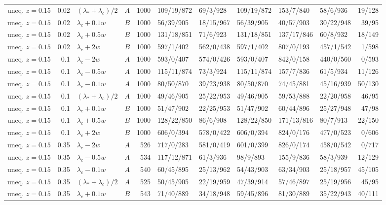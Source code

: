 \begin{longtable}{@{}lrllrlllllr@{}}
uneq. $z{=}0.15$ & 0.02 & $(\lambda_*+\lambda_c)/2$ & $A$ & 1000 & 109/19/872 & 69/3/928 & 109/19/872 & 153/7/840 & 58/6/936 & 19/128\\
uneq. $z{=}0.15$ & 0.02 & $\lambda_c+0.1w$ & $B$ & 1000 & 56/39/905 & 18/15/967 & 56/39/905 & 40/57/903 & 30/22/948 & 39/95\\
uneq. $z{=}0.15$ & 0.02 & $\lambda_c+0.5w$ & $B$ & 1000 & 131/18/851 & 71/6/923 & 131/18/851 & 137/17/846 & 60/8/932 & 18/149\\
uneq. $z{=}0.15$ & 0.02 & $\lambda_c+2w$ & $B$ & 1000 & 597/1/402 & 562/0/438 & 597/1/402 & 807/0/193 & 457/1/542 & 1/598\\
uneq. $z{=}0.15$ & 0.1 & $\lambda_c-2w$ & $A$ & 1000 & 593/0/407 & 574/0/426 & 593/0/407 & 842/0/158 & 440/0/560 & 0/593\\
uneq. $z{=}0.15$ & 0.1 & $\lambda_c-0.5w$ & $A$ & 1000 & 115/11/874 & 73/3/924 & 115/11/874 & 157/7/836 & 61/5/934 & 11/126\\
uneq. $z{=}0.15$ & 0.1 & $\lambda_c-0.1w$ & $A$ & 1000 & 80/50/870 & 39/23/938 & 80/50/870 & 74/45/881 & 45/16/939 & 50/130\\
uneq. $z{=}0.15$ & 0.1 & $(\lambda_*+\lambda_c)/2$ & $A$ & 1000 & 49/46/905 & 25/22/953 & 49/46/905 & 59/53/888 & 22/20/958 & 46/95\\
uneq. $z{=}0.15$ & 0.1 & $\lambda_c+0.1w$ & $B$ & 1000 & 51/47/902 & 22/25/953 & 51/47/902 & 60/44/896 & 25/27/948 & 47/98\\
uneq. $z{=}0.15$ & 0.1 & $\lambda_c+0.5w$ & $B$ & 1000 & 128/22/850 & 86/6/908 & 128/22/850 & 171/13/816 & 80/7/913 & 22/150\\
uneq. $z{=}0.15$ & 0.1 & $\lambda_c+2w$ & $B$ & 1000 & 606/0/394 & 578/0/422 & 606/0/394 & 824/0/176 & 477/0/523 & 0/606\\
uneq. $z{=}0.15$ & 0.35 & $\lambda_c-2w$ & $A$ & 526 & 717/0/283 & 581/0/419 & 601/0/399 & 826/0/174 & 458/0/542 & 0/717\\
uneq. $z{=}0.15$ & 0.35 & $\lambda_c-0.5w$ & $A$ & 534 & 117/12/871 & 61/3/936 & 98/9/893 & 155/9/836 & 58/3/939 & 12/129\\
uneq. $z{=}0.15$ & 0.35 & $\lambda_c-0.1w$ & $A$ & 540 & 60/45/895 & 25/13/962 & 54/43/903 & 63/34/903 & 25/18/957 & 45/105\\
uneq. $z{=}0.15$ & 0.35 & $(\lambda_*+\lambda_c)/2$ & $A$ & 525 & 50/45/905 & 22/19/959 & 47/39/914 & 57/46/897 & 25/19/956 & 45/95\\
uneq. $z{=}0.15$ & 0.35 & $\lambda_c+0.1w$ & $B$ & 543 & 71/40/889 & 34/18/948 & 59/45/896 & 81/30/889 & 35/22/943 & 40/111\\

\end{longtable}
